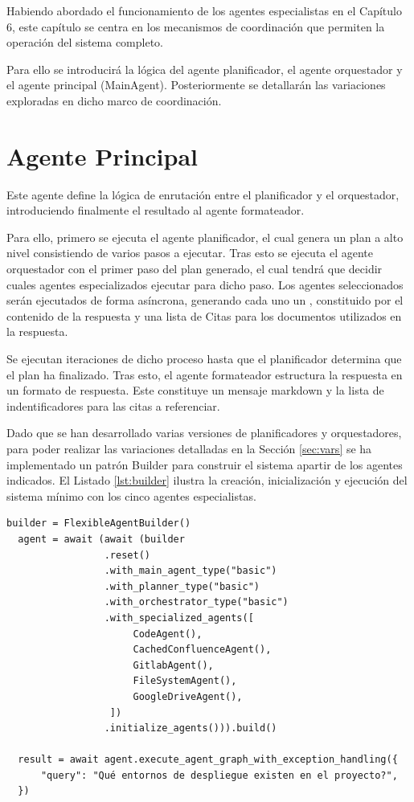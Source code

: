 Habiendo abordado el funcionamiento de los agentes especialistas en el Capítulo 6, este capítulo se centra en los mecanismos de coordinación que permiten la operación del sistema completo.

Para ello se introducirá la lógica del agente planificador, el agente orquestador y el agente principal (MainAgent). Posteriormente se detallarán las variaciones exploradas en dicho marco de coordinación.

\section{Agente Principal}
\label{sec:principal}
Este agente define la lógica de enrutación entre el planificador y el orquestador, introduciendo finalmente el resultado al agente formateador. 

Para ello, primero se ejecuta el agente planificador, el cual genera un plan a alto nivel consistiendo de varios pasos a ejecutar. Tras esto se ejecuta el agente orquestador con el primer paso del plan generado, el cual tendrá que decidir cuales agentes especializados ejecutar para dicho paso. Los agentes seleccionados serán ejecutados de forma asíncrona, generando cada uno un , constituido por el contenido de la respuesta y una lista de Citas para los documentos utilizados en la respuesta.

Se ejecutan iteraciones de dicho proceso hasta que el planificador determina que el plan ha finalizado. Tras esto, el agente formateador estructura la respuesta en un formato de respuesta. Este constituye un mensaje markdown y la lista de indentificadores para las citas a referenciar.  

Dado que se han desarrollado varias versiones de planificadores y orquestadores, para poder realizar las variaciones detalladas en la Sección \ref{sec:vars} se ha implementado un patrón Builder para construir el sistema apartir de los agentes indicados. El Listado \ref{lst:builder} ilustra la creación, inicialización y ejecución del sistema mínimo con los cinco agentes especialistas. 

\begin{lstlisting}[caption={Instanciación y ejecución del sistema mínimo con el patrón Builder},label={lst:builder}]
  builder = FlexibleAgentBuilder()
  agent = await (await (builder
                 .reset()
                 .with_main_agent_type("basic")
                 .with_planner_type("basic")
                 .with_orchestrator_type("basic")
                 .with_specialized_agents([
                      CodeAgent(),
                      CachedConfluenceAgent(),
                      GitlabAgent(),
                      FileSystemAgent(),
                      GoogleDriveAgent(),
                  ])
                 .initialize_agents())).build()

  result = await agent.execute_agent_graph_with_exception_handling({
      "query": "Qué entornos de despliegue existen en el proyecto?",
  })
\end{lstlisting}

